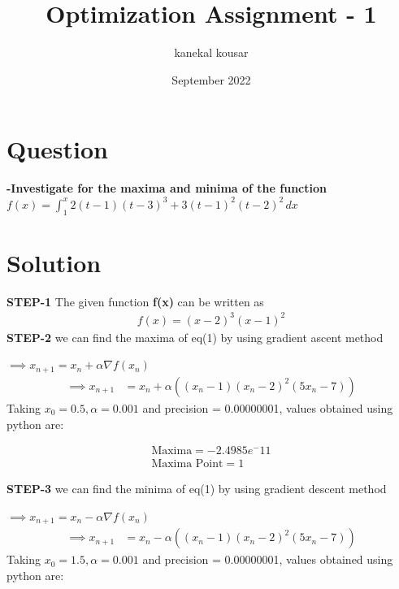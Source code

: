 \documentclass[journal,12pt,twocolumn]{IEEEtran}
\title{\textbf{Optimization Assignment - 1}}
\author{kanekal kousar}
\date{September 2022}
\providecommand{\brak}[1]{\ensuremath{\left(#1\right)}}
\begin{document}
\maketitle

\section{Question}
\textbf{-Investigate for the maxima and minima of the function
 $f(x)=\int_{1}^{x}2(t-1)(t-3)^3+3(t-1)^2(t-2)^2 \,dx$}
 
 \section{Solution}
 \textbf{STEP-1}
 The given function \textbf{f(x)} can be written as
 \begin{align}
 f(x)=(x-2)^3(x-1)^2
 \end{align}
 \textbf{STEP-2}
 we can find the maxima of eq(1) by using gradient ascent method
 
$\implies x_{n+1} = x_n + \alpha \nabla f(x_n) $\\
 \begin{align}
        \implies x_{n+1} &= x_n + \alpha \brak{(x_n-1)(x_n-2)^2(5x_n-7)}
    \end{align}
 Taking $x_0=0.5,\alpha=0.001$ and precision = 0.00000001, values obtained using python are:
    
    \begin{align}
        \boxed{\text{Maxima} = -2.4985e^-11}\\
        \boxed{\text{Maxima Point} = 1}
    \end{align}
 
 \textbf{STEP-3}
 we can find the minima of eq(1) by using gradient descent method
 
$\implies x_{n+1} = x_n - \alpha \nabla f(x_n) $\\
 \begin{align}
        \implies x_{n+1} &= x_n - \alpha \brak{(x_n-1)(x_n-2)^2(5x_n-7)}
    \end{align}
Taking $x_0=1.5,\alpha=0.001$ and precision = 0.00000001, values obtained using python are:
    
\end{document}
